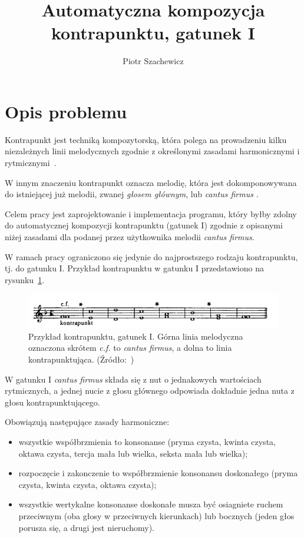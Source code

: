 \documentclass{article}
\title{Automatyczna kompozycja kontrapunktu, gatunek I}
\author{Piotr Szachewicz}
\begin{document}
\maketitle

\section{Opis problemu}

Kontrapunkt jest techniką kompozytorską, która polega na prowadzeniu kilku niezależnych linii melodycznych zgodnie z określonymi zasadami harmonicznymi i rytmicznymi~\cite{wikiCounterpoint}.

W innym znaczeniu kontrapunkt oznacza melodię, która jest dokomponowywana do istniejącej już melodii, zwanej \emph{głosem głównym}, lub \emph{cantus firmus} \cite{Sikorski}.

Celem pracy jest zaprojektowanie i implementacja programu, który byłby zdolny do automatycznej kompozycji kontrapunktu (gatunek I) zgodnie z opisanymi niżej zasadami dla podanej przez użytkownika melodii \emph{cantus firmus}.

W ramach pracy ograniczono się jedynie do najprostszego rodzaju kontrapunktu, tj. do gatunku I. Przykład kontrapunktu w gatunku I przedstawiono na rysunku~\ref{fig:kontrapunkt_przyklad_gawlas}.

\begin{figure}[htb]
\centering
\includegraphics[width=1.0\textwidth]{images/kontrapunkt_przyklad_gawlas.png}
\caption{Przykład kontrapunktu, gatunek I. Górna linia melodyczna oznaczona skrótem \emph{c.f.} to \emph{cantus firmus}, a dolna to linia kontrapunktująca. (Źródło:~\cite{gawlas})}
\label{fig:kontrapunkt_przyklad_gawlas}
\end{figure}

W gatunku I \emph{cantus firmus} składa się z nut o jednakowych wartościach rytmicznych, a jednej nucie z głosu głównego odpowiada dokładnie jedna nuta z głosu kontrapunktującego.

Obowiązują następujące zasady harmoniczne:

\begin{itemize}
\item wszystkie współbrzmienia to konsonanse (pryma czysta, kwinta czysta, oktawa czysta, tercja mała lub wielka, seksta mała lub wielka);
\item rozpoczęcie i zakonczenie to współbrzmienie konsonansu doskonałego (pryma czysta, kwinta czysta, oktawa czysta);
\item wszystkie wertykalne konsonanse doskonałe musza być osiagniete ruchem przeciwnym (oba głosy w przeciwnych kierunkach) lub bocznych (jeden głos porusza się, a drugi jest nieruchomy).
\end{itemize}
\end{document}
